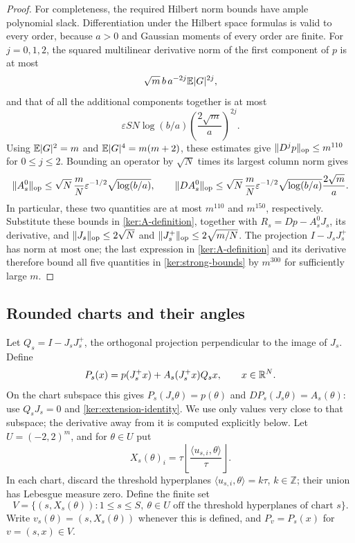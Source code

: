 \begin{proof}
For completeness, the required Hilbert norm bounds have ample polynomial
slack.  Differentiation under the Hilbert space formulas is valid to every
order, because $a>0$ and Gaussian moments of every order are finite.
For $j=0,1,2$, the squared multilinear derivative norm of the first
component of $p$ is at most
\[
 \sqrt m\,b\,a^{-2j}\mathbb E|G|^{2j},
\]
and that of all the additional components together is at most
\[
 \varepsilon SN\log(b/a)
       \left(\frac{2\sqrt m}{a}\right)^{2j}.
\]
Using $\mathbb E|G|^2=m$ and $\mathbb E|G|^4=m(m+2)$, these estimates give
$\|D^jp\|_{\mathrm{op}}\le m^{110}$ for $0\le j\le2$.
Bounding an operator by $\sqrt N$ times its largest column norm gives
\[
 \|A_s^0\|_{\mathrm{op}}
 \le \sqrt N\,\frac{m}{N}\varepsilon^{-1/2}\sqrt{\log(b/a)},
 \qquad
 \|DA_s^0\|_{\mathrm{op}}
 \le \sqrt N\,\frac{m}{N}\varepsilon^{-1/2}
          \sqrt{\log(b/a)}\frac{2\sqrt m}{a}.
\]
In particular, these two quantities are at most $m^{110}$ and $m^{150}$,
respectively.  Substitute these bounds in
\eqref{ker:A-definition}, together with
$R_s=Dp-A_s^0J_s$, its derivative, and
$\|J_s\|_{\mathrm{op}}\le2\sqrt N$ and
$\|J_s^+\|_{\mathrm{op}}\le2\sqrt{m/N}$.
The projection $I-J_sJ_s^+$ has norm at most one; the last expression
in \eqref{ker:A-definition} and its derivative therefore bound all five
quantities in \eqref{ker:strong-bounds} by $m^{300}$ for sufficiently
large $m$.
\end{proof}

\subsection{Rounded charts and their angles}

Let $Q_s=I-J_sJ_s^+$, the orthogonal projection perpendicular to the
image of $J_s$.  Define
\begin{equation}
\label{ker:P-definition}
 P_s(x)=p(J_s^+x)+A_s(J_s^+x)Q_sx,
 \qquad x\in\mathbb R^N.
\end{equation}
On the chart subspace this gives $P_s(J_s\theta)=p(\theta)$ and
$DP_s(J_s\theta)=A_s(\theta)$: use $Q_sJ_s=0$ and
\eqref{ker:extension-identity}. We use only values very close to that
subspace; the derivative away from it is computed explicitly below.
Let $U=(-2,2)^m$, and for $\theta\in U$ put
\begin{equation}
\label{ker:rounding}
 X_s(\theta)_i
 =\tau\left\lfloor\frac{\langle u_{s,i},\theta\rangle}{\tau}
       \right\rfloor.
\end{equation}
In each chart, discard the threshold hyperplanes
$\langle u_{s,i},\theta\rangle=k\tau$, $k\in\mathbb Z$;
their union has Lebesgue measure zero.  Define the finite set
\begin{equation}
\label{ker:vertices}
 V=\{(s,X_s(\theta)):1\le s\le S,\ 
       \theta\in U\text{ off the threshold hyperplanes of chart }s\}.
\end{equation}
Write $v_s(\theta)=(s,X_s(\theta))$ whenever this is defined, and
$P_v=P_s(x)$ for $v=(s,x)\in V$.

